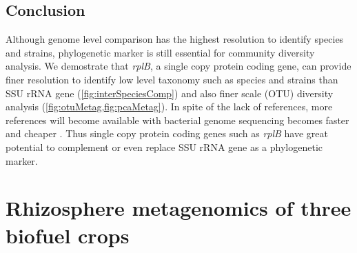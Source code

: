 \documentclass[]{msu-thesis}
\begin{document}
\section{Conclusion}

Although genome level comparison has the highest resolution to identify species and strains, phylogenetic marker is still essential for community diversity analysis. We demostrate that \textit{rplB}, a single copy protein coding gene, can provide finer resolution to identify low level taxonomy such as species and strains than SSU rRNA gene (\cref{fig:interSpeciesComp}) and also finer scale (OTU) diversity analysis (\cref{fig:otuMetag,fig:pcaMetag}). In spite of the lack of references, more references will become available with bacterial genome sequencing becomes faster and cheaper \cite{land_insights_2015}. Thus single copy protein coding genes such as \textit{rplB} have great potential to complement or even replace SSU rRNA gene as a phylogenetic marker. 


\chapter{Rhizosphere metagenomics of three biofuel crops}
%
%
%
%
%
%
\end{document}
